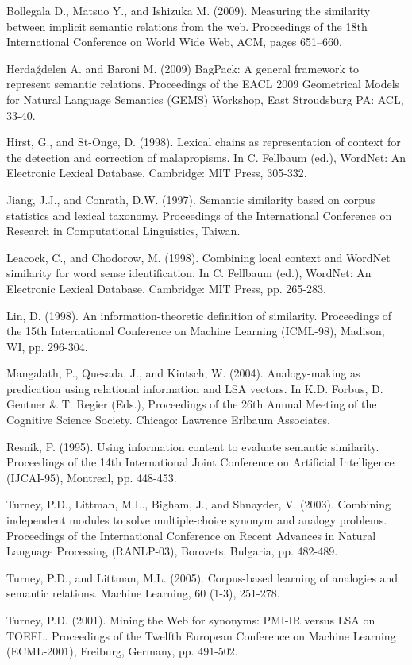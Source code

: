 \documentclass[11pt]{article}
\begin{document}
Bollegala D., Matsuo Y., and Ishizuka M. (2009). Measuring the similarity between implicit semantic relations from the web. Proceedings of the 18th International Conference on World Wide Web, ACM, pages 651–660.

Herdağdelen A. and Baroni M. (2009) BagPack: A general framework to represent semantic relations. Proceedings of the EACL 2009 Geometrical Models for Natural Language Semantics (GEMS) Workshop, East Stroudsburg PA: ACL, 33-40.

Hirst, G., and St-Onge, D. (1998). Lexical chains as representation of context for the detection and correction of malapropisms. In C. Fellbaum (ed.), WordNet: An Electronic Lexical Database. Cambridge: MIT Press, 305-332.

Jiang, J.J., and Conrath, D.W. (1997). Semantic similarity based on corpus statistics and lexical taxonomy. Proceedings of the International Conference on Research in Computational Linguistics, Taiwan.

Leacock, C., and Chodorow, M. (1998). Combining local context and WordNet similarity for word sense identification. In C. Fellbaum (ed.), WordNet: An Electronic Lexical Database. Cambridge: MIT Press, pp. 265-283.

Lin, D. (1998). An information-theoretic definition of similarity. Proceedings of the 15th International Conference on Machine Learning (ICML-98), Madison, WI, pp. 296-304.

Mangalath, P., Quesada, J., and Kintsch, W. (2004). Analogy-making as predication using relational information and LSA vectors. In K.D. Forbus, D. Gentner \& T. Regier (Eds.), Proceedings of the 26th Annual Meeting of the Cognitive Science Society. Chicago: Lawrence Erlbaum Associates.

Resnik, P. (1995). Using information content to evaluate semantic similarity. Proceedings of the 14th International Joint Conference on Artificial Intelligence (IJCAI-95), Montreal, pp. 448-453.

Turney, P.D., Littman, M.L., Bigham, J., and Shnayder, V. (2003). Combining independent modules to solve multiple-choice synonym and analogy problems. Proceedings of the International Conference on Recent Advances in Natural Language Processing (RANLP-03), Borovets, Bulgaria, pp. 482-489.

Turney, P.D., and Littman, M.L. (2005). Corpus-based learning of analogies and semantic relations. Machine Learning, 60 (1-3), 251-278.

Turney, P.D. (2001). Mining the Web for synonyms: PMI-IR versus LSA on TOEFL. Proceedings of the Twelfth European Conference on Machine Learning (ECML-2001), Freiburg, Germany, pp. 491-502.
\end{document}

